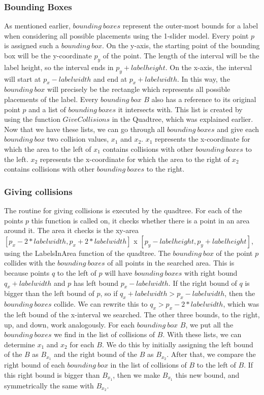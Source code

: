 \documentclass[crop=false,a4paper,oneside,11pt]{article}
\begin{document}
\subsubsection{Bounding Boxes}
As mentioned earlier, $bounding \ boxes$ represent the outer-most bounds for a label when considering all possible placements using the 1-slider model. Every point $p$ is assigned such a $bounding \ box$. On the y-axis, the starting point of the bounding box will be the y-coordinate $p_y$ of the point. The length of the interval will be the label height, so the interval ends in $p_y + labelheight$. On the x-axis, the interval will start at $p_x - labelwidth$ and end at $p_x+labelwidth$. In this way, the $bounding \ box$ will precisely be the rectangle which represents all possible placements of the label. Every $bounding \ box$ $B$ also has a reference to its original point $p$ and a list of $bounding \ boxes$ it intersects with. This list is created by using the function $GiveCollisions$ in the Quadtree, which was explained earlier. Now that we have these lists, we can go through all $bounding \ boxes$ and give each $bounding \ box$ two collision values, $x_1$ and $x_2$. $x_1$ represents the x-coordinate for which the area to the left of $x_1$ contains collisions with other $bounding \ boxes$ to the left. $x_2$ represents the x-coordinate for which the area to the right of $x_2$ contains collisions with other $bounding \ boxes$ to the right. 
\subsubsection{Giving collisions}
The routine for giving collisions is executed by the quadtree. For each of the points $p$ this function is called on, it checks whether there is a point in an area around it. The area it checks is the xy-area $[p_x - 2*labelwidth, p_x + 2*labelwidth]$ x $[p_y - labelheight, p_y + labelheight]$, using the LabelsInArea function of the quadtree. The $bounding \ box$ of the point $p$ collides with the $bounding \ boxes$ of all points in the searched area. This is because points $q$ to the left of $p$ will have $bounding \ boxes$ with right bound $q_x + labelwidth$ and $p$ has left bound $p_x - labelwidth$. If the right bound of $q$ is bigger than the left bound of $p$, so if $q_x + labelwidth > p_x - labelwidth$, then the $bounding \ boxes$ collide. We can rewrite this to $q_x > p_x - 2*labelwidth$, which was the left bound of the x-interval we searched. The other three bounds, to the right, up, and down, work analogously. For each $bounding \ box$ $B$, we put all the $bounding \ boxes$ we find in the list of collisions of $B$. With these lists, we can determine $x_1$ and $x_2$ for each $B$. We do this by initially assigning the left bound of the $B$ as $B_{x_1}$ and the right bound of the $B$ as $B_{x_2}$. After that, we compare the right bound of each $bounding \ box$ in the list of collisions of $B$ to the left of $B$. If this right bound is bigger than $B_{x_1}$, then we make $B_{x_1}$ this new bound, and symmetrically the same with $B_{x_2}$. 
\end{document}
